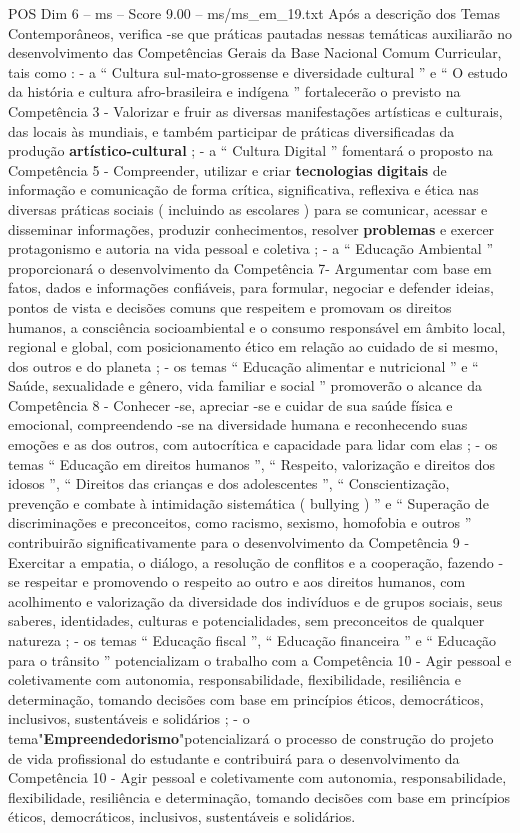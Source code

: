 \begin{textsample}{POS Dim 6 – ms – Score 9.00 – ms/ms\_em\_19.txt}
Após a descrição dos Temas Contemporâneos, verifica -se que práticas pautadas nessas temáticas auxiliarão no desenvolvimento das Competências Gerais da Base Nacional Comum Curricular, tais como : - a “ Cultura sul-mato-grossense e diversidade cultural ” e “ O estudo da história e cultura afro-brasileira e indígena ” fortalecerão o previsto na Competência 3 - Valorizar e fruir as diversas manifestações artísticas e culturais, das locais às mundiais, e também participar de práticas diversificadas da produção \textbf{artístico-cultural} ; - a “ Cultura Digital ” fomentará o proposto na Competência 5 - Compreender, utilizar e criar \textbf{tecnologias} \textbf{digitais} de informação e comunicação de forma crítica, significativa, reflexiva e ética nas diversas práticas sociais ( incluindo as escolares ) para se comunicar, acessar e disseminar informações, produzir conhecimentos, resolver \textbf{problemas} e exercer protagonismo e autoria na vida pessoal e coletiva ; - a “ Educação Ambiental ” proporcionará o desenvolvimento da Competência 7- Argumentar com base em fatos, dados e informações confiáveis, para formular, negociar e defender ideias, pontos de vista e decisões comuns que respeitem e promovam os direitos humanos, a consciência socioambiental e o consumo responsável em âmbito local, regional e global, com posicionamento ético em relação ao cuidado de si mesmo, dos outros e do planeta ; - os temas “ Educação alimentar e nutricional ” e “ Saúde, sexualidade e gênero, vida familiar e social ” promoverão o alcance da Competência 8 - Conhecer -se, apreciar -se e cuidar de sua saúde física e emocional, compreendendo -se na diversidade humana e reconhecendo suas emoções e as dos outros, com autocrítica e capacidade para lidar com elas ; - os temas “ Educação em direitos humanos ”, “ Respeito, valorização e direitos dos idosos ”, “ Direitos das crianças e dos adolescentes ”, “ Conscientização, prevenção e combate à intimidação sistemática ( bullying ) ” e “ Superação de discriminações e preconceitos, como racismo, sexismo, homofobia e outros ” contribuirão significativamente para o desenvolvimento da Competência 9 - Exercitar a empatia, o diálogo, a resolução de conflitos e a cooperação, fazendo -se respeitar e promovendo o respeito ao outro e aos direitos humanos, com acolhimento e valorização da diversidade dos indivíduos e de grupos sociais, seus saberes, identidades, culturas e potencialidades, sem preconceitos de qualquer natureza ; - os temas “ Educação fiscal ”, “ Educação financeira ” e “ Educação para o trânsito ” potencializam o trabalho com a Competência 10 - Agir pessoal e coletivamente com autonomia, responsabilidade, flexibilidade, resiliência e determinação, tomando decisões com base em princípios éticos, democráticos, inclusivos, sustentáveis e solidários ; - o tema"\textbf{Empreendedorismo}"potencializará o processo de construção do projeto de vida profissional do estudante e contribuirá para o desenvolvimento da Competência 10 - Agir pessoal e coletivamente com autonomia, responsabilidade, flexibilidade, resiliência e determinação, tomando decisões com base em princípios éticos, democráticos, inclusivos, sustentáveis e solidários.

\end{textsample}
